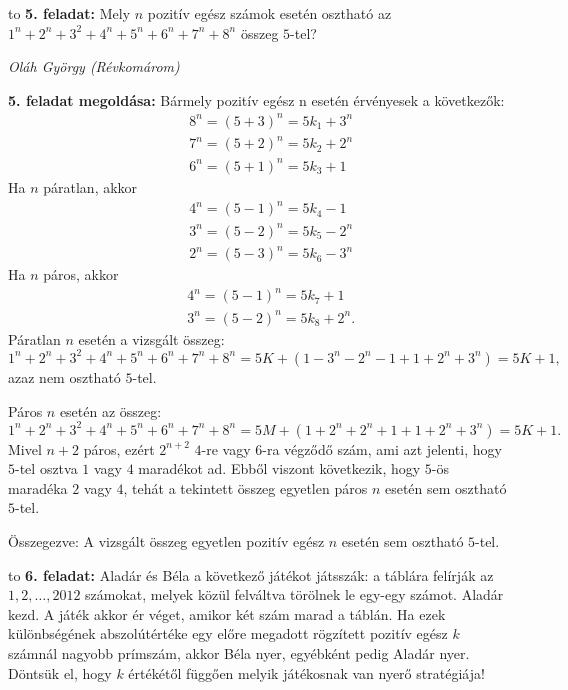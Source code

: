 \documentclass[a4paper,10pt]{article}
\def\ki#1#2{\hfill {\it #1 (#2)}\medskip}
\begin{document}
\medskip


\hbox to 
{\bf 5. feladat: } Mely $n$ pozitív egész számok esetén osztható az $1^n+2^n+3^2+4^n+5^n+6^n+7^n+8^n$ összeg $5$-tel?

\ki{Oláh György}{Révkomárom}\medskip

{\bf 5. feladat megoldása: } Bármely pozitív egész n esetén érvényesek a következők:
\begin{eqnarray*}
&&8^n=\left(5+3\right)^n=5k_1+3^n\\
&&7^n=\left(5+2\right)^n=5k_2+2^n\\
&&6^n=\left(5+1\right)^n=5k_3+1
\end{eqnarray*}
Ha $n$ páratlan, akkor 
\begin{eqnarray*}
&&4^n=\left(5-1\right)^n=5k_4-1\\
&&3^n=\left(5-2\right)^n=5k_5-2^n\\
&&2^n=\left(5-3\right)^n=5k_6-3^n
\end{eqnarray*}
Ha $n$ páros, akkor 
\begin{eqnarray*}
&&4^n=\left(5-1\right)^n=5k_7+1\\
&&3^n=\left(5-2\right)^n=5k_8+2^n.
\end{eqnarray*}
Páratlan $n$ esetén a vizsgált összeg:
$$1^n+2^n+3^2+4^n+5^n+6^n+7^n+8^n=5K+\left(1-3^n-2^n-1+1+2^n+3^n\right)=5K+1,$$
azaz nem osztható $5$-tel.

Páros $n$ esetén az összeg: 
$$1^n+2^n+3^2+4^n+5^n+6^n+7^n+8^n=5M+\left(1+2^n+2^n+1+1+2^n+3^n\right
)=5K+1.$$ Mivel $n+2$ páros, ezért $2^{n+2}$ $4$-re vagy $6$-ra 
végződő szám, ami azt jelenti, hogy $5$-tel osztva $1$ vagy $4$ 
maradékot ad. Ebből viszont következik, hogy $5$-ös maradéka $2$ 
vagy $4$, tehát a tekintett összeg egyetlen páros $n$ esetén sem 
osztható $5$-tel.

Összegezve: A vizsgált összeg egyetlen pozitív egész $n$ esetén sem 
osztható $5$-tel.

\medskip


\hbox to 
{\bf 6. feladat: } Aladár és Béla a következő játékot játsszák: a táblára felírják az $1, 2, \dots, 2012$ számokat, 
melyek közül felváltva törölnek le egy-egy számot. Aladár kezd. A játék akkor ér véget, amikor két szám marad a táblán. Ha ezek különbségének abszolútértéke egy előre megadott rögzített pozitív egész $k$ számnál nagyobb prímszám, akkor Béla nyer, egyébként pedig 
Aladár nyer. Döntsük el, hogy $k$ értékétől függően melyik játékosnak van nyerő stratégiája!
\end{document}
